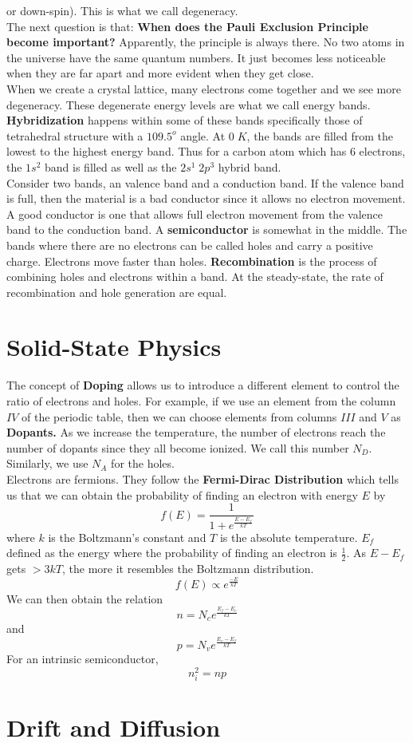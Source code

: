 \documentclass{article}
\begin{document}
or down-spin). This is what we call degeneracy.
\vspace{8pt}
\\The next question is that: \textbf{When does the Pauli Exclusion Principle become 
important?} Apparently, the principle is always there. No two atoms in the universe have 
the same quantum numbers. It just becomes less noticeable when they are far apart and
more evident when they get close. 
\vspace{8pt}
\\ When we create a crystal lattice, many electrons come together and we see more 
degeneracy. These degenerate energy levels are what we call energy bands. 
\textbf{Hybridization} happens within some of these bands specifically those of 
tetrahedral structure with a $109.5^{o}$ angle. At $0\;K$, the bands are filled from  
the lowest to the highest energy band. Thus for a carbon atom which has 6 electrons,
the $1s^2$ band is filled as well as the $2s^{1}\; 2p^{3}$ hybrid band. 
\vspace{8pt}
\\ Consider two bands, an valence band and a conduction band. If the valence band is full,
then the material is a bad conductor since it allows no electron movement. A good conductor 
is one that allows full electron movement from the valence band to the conduction band.
A \textbf{semiconductor} is somewhat in the middle. The bands where there are no 
electrons can be called holes and carry a positive charge. Electrons move faster than
holes. \textbf{Recombination} is the process of combining holes and electrons within
a band. At the steady-state, the rate of recombination and hole generation are equal.

\section{Solid-State Physics}
\noindent 
The concept of \textbf{Doping} allows us to introduce a different element to control 
the ratio of electrons and holes. For example, if we use an element from the column
$IV$ of the periodic table, then we can choose elements from columns $III$ and $V$ as
\textbf{Dopants.} As we increase the temperature, the number of electrons reach the 
number of dopants since they all become ionized. We call this number $N_D$. Similarly,
we use $N_A$ for the holes. 
\vspace{8pt}
\\ Electrons are fermions. They follow the \textbf{Fermi-Dirac Distribution} which 
tells us that we can obtain the probability of finding an electron with energy $E$ by
$$f(E) = \frac{1}{1+e^{\frac{E-E_{f}}{kT}}}$$ where $k$ is the Boltzmann's constant
and $T$ is the absolute temperature. $E_{f}$ defined as the energy where the probability
of finding an electron is $\frac{1}{2}$. As $E-E_{f}$ gets $>3kT$, the more it 
resembles the Boltzmann distribution. $$f(E) \propto{e^\frac{-E}{kT}}$$
We can then obtain the relation $$n = N_{c} e^\frac{E_f - E_c}{kT}$$ and 
$$p = N_{v} e^\frac{E_v - E_f}{kT}$$ 
For an intrinsic semiconductor, $$\boxed{n_{i}^2 = np}$$

\newpage 
\section{Drift and Diffusion}
\noindent 
\end{document}
